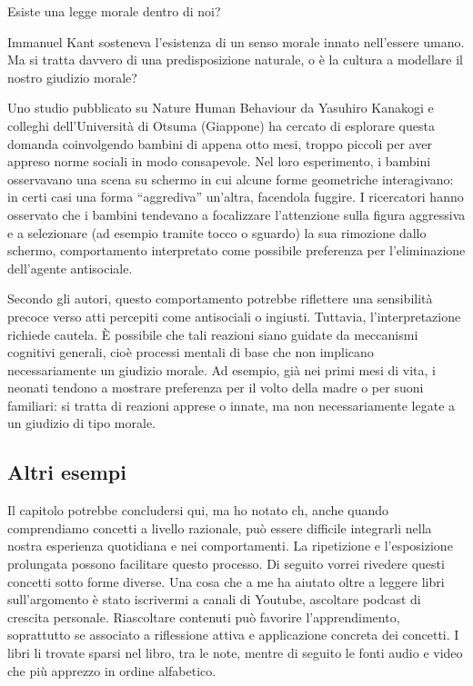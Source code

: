 \documentclass[12pt]{book} %
\begin{document}
\begin{mdframed}[linewidth=1pt]
Esiste una legge morale dentro di noi?

Immanuel Kant sosteneva l’esistenza di un senso morale innato nell’essere umano. Ma si tratta davvero di una predisposizione naturale, o è la cultura a modellare il nostro giudizio morale?

Uno studio pubblicato su Nature Human Behaviour da Yasuhiro Kanakogi e colleghi dell'Università di Otsuma (Giappone) ha cercato di esplorare questa domanda coinvolgendo bambini di appena otto mesi, troppo piccoli per aver appreso norme sociali in modo consapevole.
Nel loro esperimento, i bambini osservavano una scena su schermo in cui alcune forme geometriche interagivano: in certi casi una forma “aggrediva” un’altra, facendola fuggire. I ricercatori hanno osservato che i bambini tendevano a focalizzare l’attenzione sulla figura aggressiva e a selezionare (ad esempio tramite tocco o sguardo) la sua rimozione dallo schermo, comportamento interpretato come possibile preferenza per l’eliminazione dell’agente antisociale.

Secondo gli autori, questo comportamento potrebbe riflettere una sensibilità precoce verso atti percepiti come antisociali o ingiusti. Tuttavia, l’interpretazione richiede cautela. È possibile che tali reazioni siano guidate da meccanismi cognitivi generali, cioè processi mentali di base che non implicano necessariamente un giudizio morale. Ad esempio, già nei primi mesi di vita, i neonati tendono a mostrare preferenza per il volto della madre o per suoni familiari: si tratta di reazioni apprese o innate, ma non necessariamente legate a un giudizio di tipo morale.
\end{mdframed}

\subsection{Altri esempi}
Il capitolo potrebbe concludersi qui, ma ho notato ch, anche quando comprendiamo concetti a livello razionale, può essere difficile integrarli nella nostra esperienza quotidiana e nei comportamenti. La ripetizione e l'esposizione prolungata possono facilitare questo processo.
Di seguito vorrei rivedere questi concetti sotto forme diverse. Una cosa che a me ha aiutato oltre a leggere libri sull'argomento è stato iscrivermi a
canali di Youtube, ascoltare podcast di crescita personale. Riascoltare contenuti può favorire l’apprendimento, soprattutto se associato a riflessione attiva e applicazione concreta dei concetti. I libri li trovate sparsi nel libro, tra le note, mentre di seguito le fonti
audio e video che più apprezzo in ordine alfabetico.
\end{document}
